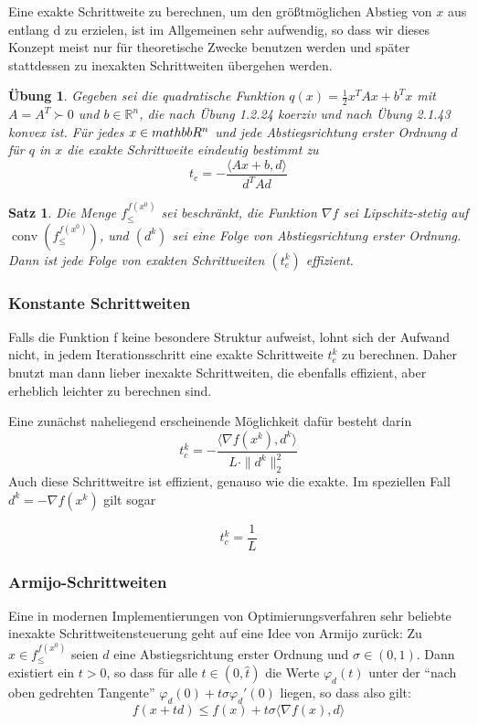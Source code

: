 \documentclass[11pt]{scrreprt}
\newcounter{thm}
\numberwithin{thm}{section}
\newtheorem{satz}[thm]{Satz}
\newtheorem{uebung}[thm]{Übung}
\begin{document}
Eine exakte Schrittweite zu berechnen, um den größtmöglichen Abstieg von $x$ aus entlang d zu erzielen, ist im Allgemeinen sehr aufwendig, so dass wir dieses Konzept meist nur für theoretische Zwecke benutzen werden und später stattdessen zu inexakten Schrittweiten übergehen werden. 

\begin{uebung}
	Gegeben sei die quadratische Funktion $q(x) = \frac{1}{2} x^T A x + b^T x$ mit $A = A^T \succ 0$ und $b \in \mathbb{R}^n$, die nach Übung 1.2.24 koerziv und nach Übung 2.1.43 konvex ist. Für 
	jedes $x \in \\mathbb{R}^n$ und jede Abstiegsrichtung erster Ordnung $d$ 
	für $q$ in $x$ die exakte Schrittweite eindeutig bestimmt zu
	$$ t_e = - \frac{\langle Ax + b, d \rangle}{d^T A d} $$
\end{uebung}

\begin{satz}
	Die Menge $f_{\leq}^{f(x^0)}$ sei beschränkt, die Funktion $\nabla f$ sei Lipschitz-stetig auf $\operatorname{conv}(f_{\leq}^{f(x^0)})$, und $(d^k)$ sei eine Folge von Abstiegsrichtung erster Ordnung. Dann ist jede Folge von exakten Schrittweiten $(t_e^k)$ effizient.
\end{satz}

\subsubsection*{Konstante Schrittweiten}

Falls die Funktion f keine besondere Struktur aufweist, lohnt sich der Aufwand nicht, in jedem Iterationsschritt eine exakte Schrittweite $t_e^k$ zu berechnen. Daher bnutzt man dann lieber inexakte Schrittweiten, die ebenfalls effizient, aber erheblich leichter zu berechnen sind. ~\bigskip

Eine zunächst naheliegend erscheinende Möglichkeit dafür besteht darin 
 $$ t_c^k = - \frac{\langle \nabla f(x^k), d^k \rangle}{L \cdot \|d^k \|_2^2} $$
Auch diese Schrittweitre ist effizient, genauso wie die exakte. Im speziellen Fall $d^k = -\nabla f (x^k)$ gilt sogar

	$$ t_c^k = \frac{1}{L} $$
	

\subsubsection*{Armijo-Schrittweiten}
	
Eine in modernen Implementierungen von Optimierungsverfahren sehr beliebte inexakte Schrittweitensteuerung geht auf eine Idee von Armijo zurück: Zu $x \in f_{\leq}^{f(x^0)}$ seien $d$ eine Abstiegsrichtung erster Ordnung und $\sigma \in (0,1)$. Dann existiert ein $t > 0$, so dass für alle $t \in (0, \hat{t})$ die Werte $\varphi_d(t)$ unter der \enquote{nach oben gedrehten Tangente} $\varphi_d(0) + t \sigma \varphi_d'(0)$ liegen, so dass also gilt:	
	$$ f(x + td) \leq f(x) + t \sigma \langle \nabla f(x), d \rangle $$
	
\end{document}

